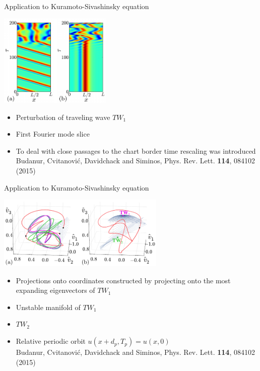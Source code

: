 \begin{frame}{Application to Kuramoto-Sivashinsky equation}
 \begin{center}
  \includegraphics[width=0.4\textwidth]{ks22reducePhysicalSpace.png}
 \end{center}
  \begin{itemize}
   \item Perturbation of traveling wave $TW_1$ 
   \item First Fourier mode slice
   \item To deal with close passages to the chart border time rescaling was introduced\vspace{9pt}\\
   \footnotesize{Budanur, Cvitanovi\'c, Davidchack and Siminos, Phys. Rev. Lett. \textbf{114}, 084102 (2015)}
  \end{itemize}
\end{frame}

\begin{frame}{Application to Kuramoto-Sivashinsky equation}
 \begin{center}
  \includegraphics[width=0.6\textwidth]{ks22reducePhaseSpace.png}
 \end{center}
 \begin{itemize}
    \item Projections onto coordinates constructed by projecting onto the most expanding eigenvectors of $TW_1$
    \item Unstable manifold of $TW_1$
    \item $TW_2$
    \item Relative periodic orbit $u(x+d_p,T_p)=u(x,0)$\vspace{9pt}\\
    \footnotesize{Budanur, Cvitanovi\'c, Davidchack and Siminos, Phys. Rev. Lett. \textbf{114}, 084102 (2015)}
   \end{itemize}
\end{frame}


